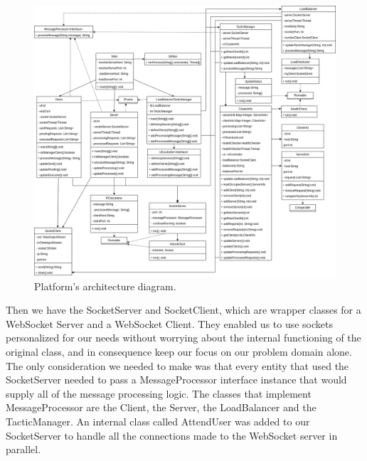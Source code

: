 \documentclass[12pt]{article}
\begin{document}
\begin{figure}[H]
  \centering
  \begin{minipage}{\textwidth}
    \centering
    \includegraphics[width=\linewidth]{img/pa3Arch.png}
  \end{minipage}%
  \caption{Platform's architecture diagram.}
  \label{fig:pa3Arch}
\end{figure} 

Then we have the SocketServer and SocketClient, which are wrapper classes for a WebSocket Server and a WebSocket Client.
They enabled us to use sockets personalized for our needs without worrying about the internal functioning of the original class, and in consequence keep our 
focus on our problem domain alone.
The only consideration we needed to make was that every entity that used the SocketServer needed to pass a MessageProcessor interface instance that would supply
all of the message processing logic.
The classes that implement MessageProcessor are the Client, the Server, the LoadBalancer and the TacticManager.
An internal class called AttendUser was added to our SocketServer to handle all the connections made to the WebSocket server in parallel.
\end{document}
